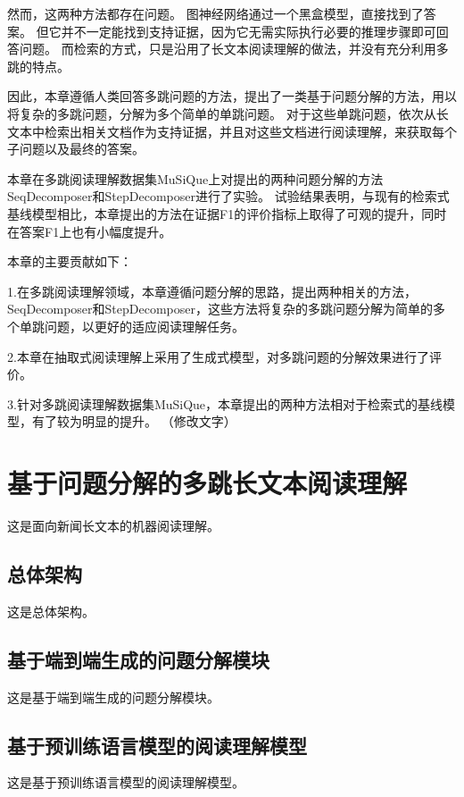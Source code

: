 然而，这两种方法都存在问题。
图神经网络通过一个黑盒模型，直接找到了答案。
但它并不一定能找到支持证据，因为它无需实际执行必要的推理步骤即可回答问题。
而检索的方式，只是沿用了长文本阅读理解的做法，并没有充分利用多跳的特点。

因此，本章遵循人类回答多跳问题的方法，提出了一类基于问题分解的方法，用以将复杂的多跳问题，分解为多个简单的单跳问题。
对于这些单跳问题，依次从长文本中检索出相关文档作为支持证据，并且对这些文档进行阅读理解，来获取每个子问题以及最终的答案。

本章在多跳阅读理解数据集MuSiQue上对提出的两种问题分解的方法SeqDecomposer和StepDecomposer进行了实验。
试验结果表明，与现有的检索式基线模型相比，本章提出的方法在证据F1的评价指标上取得了可观的提升，同时在答案F1上也有小幅度提升。

本章的主要贡献如下：

1.在多跳阅读理解领域，本章遵循问题分解的思路，提出两种相关的方法，SeqDecomposer和StepDecomposer，这些方法将复杂的多跳问题分解为简单的多个单跳问题，以更好的适应阅读理解任务。

2.本章在抽取式阅读理解上采用了生成式模型，对多跳问题的分解效果进行了评价。

3.针对多跳阅读理解数据集MuSiQue，本章提出的两种方法相对于检索式的基线模型，有了较为明显的提升。
（修改文字）

\section{基于问题分解的多跳长文本阅读理解}

这是面向新闻长文本的机器阅读理解。

\subsection{总体架构}

这是总体架构。

\subsection{基于端到端生成的问题分解模块}

这是基于端到端生成的问题分解模块。

\subsection{基于预训练语言模型的阅读理解模型}

这是基于预训练语言模型的阅读理解模型。

